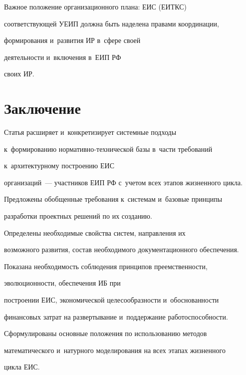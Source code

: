      

     Важное положение организационного плана: ЕИС (ЕИТКС) 

соответству\-ющей УЕИП должна быть наделена правами координации, 

формирования и~развития ИР в~сфере своей 

деятельности и~включения в~ЕИП РФ

своих ИР.

     

\section{Заключение}



\vspace*{-2pt}



     Статья расширяет и~конкретизирует системные подходы 

к~формированию нор\-ма\-тив\-но-технической базы в~части требований 

к~архитектурному построению ЕИС

организаций~--- участников ЕИП РФ с~учетом всех этапов жизненного цикла.

     

     Предложены обобщенные требования к~системам и~базовые принципы 

разработки проектных решений по их созданию. 

     

     Определены необходимые свойства систем, направления их 

возможного развития, состав необходимого документационного обеспечения.

     

     Показана необходимость соблюдения принципов преемственности, 

эволюционности, обеспечения ИБ при 

построении ЕИС, экономической целесообразности и~обоснованности 

финансовых затрат на развертывание и~поддержание работоспособности.

     

     Сформулированы основные положения по использованию методов 

математического и~натурного моделирования на всех этапах жизненного 

цикла ЕИС.

     

